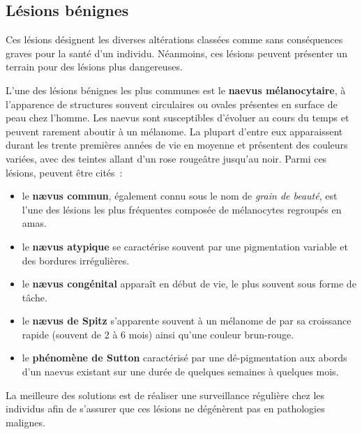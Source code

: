 \subsection{Lésions bénignes}
Ces lésions désignent les diverses altérations classées comme sans conséquences graves pour la santé d'un individu. Néanmoins, ces lésions peuvent présenter un terrain pour des lésions plus dangereuses.\par

L'une des lésions bénignes les plus communes est le \textbf{naevus mélanocytaire}, à l’apparence de structures souvent circulaires ou ovales présentes en surface de peau chez l’homme. Les naevus sont susceptibles d’évoluer au cours du temps et peuvent rarement aboutir à un mélanome. La plupart d'entre eux apparaissent durant les trente premières années de vie en moyenne et présentent des couleurs variées, avec des teintes allant d'un rose rougeâtre jusqu'au noir. Parmi ces lésions, peuvent être cités~:
\begin{itemize}
    \item le \textbf{nævus commun}, également connu sous le nom de \textit{grain de beauté}, est l'une des lésions les plus fréquentes composée de mélanocytes regroupés en amas.
    \item le \textbf{nævus atypique} se caractérise souvent par une pigmentation variable et des bordures irrégulières.
    \item le \textbf{nævus congénital} apparaît en début de vie, le plus souvent sous forme de tâche.
    \item le \textbf{nævus de Spitz} s’apparente souvent à un mélanome de par sa croissance rapide (souvent de 2 à 6 mois) ainsi qu’une couleur brun-rouge.
    \item le \textbf{phénomène de Sutton} caractérisé par une dé-pigmentation aux abords d’un naevus existant sur une durée de quelques semaines à quelques mois.
\end{itemize}\par

La meilleure des solutions est de réaliser une surveillance régulière chez les individus afin de s'assurer que ces lésions ne dégénèrent pas en pathologies malignes.\par

